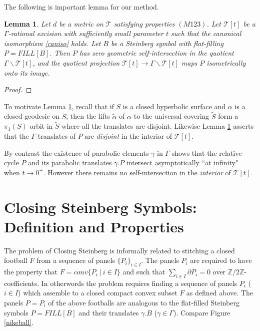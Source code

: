 \documentclass[12pt]{amsart}
\newtheorem{lem}[thm]{Lemma}
\theoremstyle{definition}
\theoremstyle{remark}
\newcommand{\bZ}{\mathbb{Z}}
\newcommand{\del}{\partial}
\newcommand{\sT}{\mathscr{T}}
\begin{document}
The following is important lemma for our method. 

\begin{lem}\label{kl}
Let $d$ be a metric on $\sT$ satisfying properties $(M123)$. Let $\sT[t]$ be a $\Gamma$-rational excision with sufficiently small parameter $t$ such that the canonical isomorphism \eqref{caniso} holds. Let $B$ be a Steinberg symbol with flat-filling $P=FILL[B]$. Then $P$ has zero geometric self-intersection in the quotient $\Gamma \backslash \sT[t]$, and the quotient projection $\sT[t] \to \Gamma \backslash \sT[t]$ maps $P$ isometrically onto its image.
\end{lem}
\begin{proof}
\end{proof}

To motivate Lemma \ref{kl}, recall that if $S$ is a closed hyperbolic surface and $\alpha$ is a closed geodesic on $S$, then the lifts $\tilde{\alpha}$ of $\alpha$ to the universal covering $\tilde{S}$ form a $\pi_1(S)$ orbit in $\tilde{S}$ where all the translates are disjoint. Likewise Lemma \ref{kl} asserts that the $\Gamma$-translates of $P$ are \emph{disjoint} in the interior of $\sT[t]$. 

By contrast the existence of parabolic elements $\gamma$ in $\Gamma$ shows that the relative cycle $P$ and its parabolic translates $\gamma.P$ intersect asymptotically ``at infinity" when $t\to 0^+$. However there remains no self-intersection in the \emph{interior} of $\sT[t]$.






\section{Closing Steinberg Symbols: Definition and Properties}\label{CS}
The problem of Closing Steinberg is informally related to stitching a closed football $F$ from a sequence of panels $\{P_i\}_{i\in I}$. The panels $P_i$ are required to have the property that $F=conv\{P_i~|~i\in I\}$ and such that $\sum_{i\in I} \del P_i=0$ over $\bZ/2\bZ$-coefficients. In otherwords the problem requires finding a sequence of panels $P_i$ ($i\in I$) which assemble to a closed compact convex subset $F$ as defined above. The panels $P=P_i$ of the above footballs are analogous to the flat-filled Steinberg symbols $P=FILL[B]$ and their translates $\gamma.B$ ($\gamma\in \Gamma$). Compare Figure \ref{nikeball}.
\end{document}

